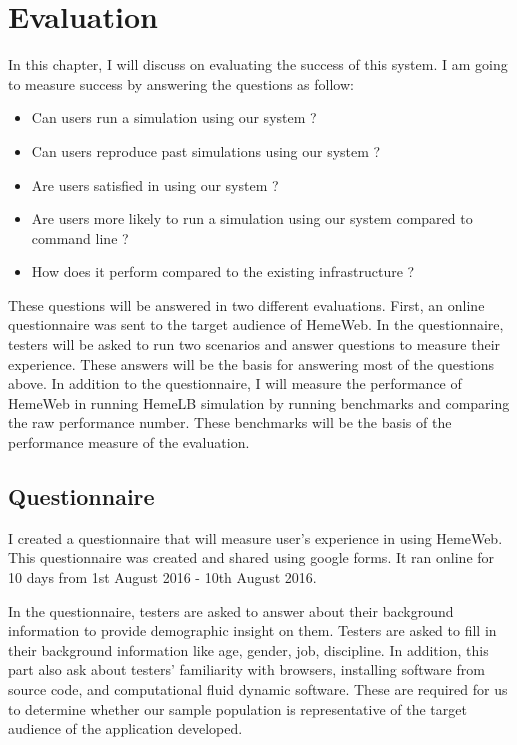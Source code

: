  

\chapter[Evaluation]{Evaluation}
In this chapter, I will discuss on evaluating the success of this system. I am going to measure success by answering the questions as follow:

\begin{itemize}
    \item Can users run a simulation using our system ?
    \item Can users reproduce past simulations using our system ?
    \item Are users satisfied in using our system ?
    \item Are users more likely to run a simulation using our system compared to command line ?
    \item How does it perform compared to the existing infrastructure ?
\end{itemize}


These questions will be answered in two different evaluations. First, an online questionnaire was sent to the target audience of HemeWeb. In the questionnaire, testers will be asked to run two scenarios and answer questions to measure their experience. These answers will be the basis for answering most of the questions above. In addition to the questionnaire, I will measure the performance of HemeWeb in running HemeLB simulation by running benchmarks and comparing the raw performance number. These benchmarks will be the basis of the performance measure of the evaluation.

\section{Questionnaire}

I created a questionnaire that will measure user's experience in using HemeWeb. This questionnaire was created and shared using google forms. It ran online for 10 days from 1st August 2016 - 10th August 2016.


In the questionnaire, testers are asked to answer about their background information to provide demographic insight on them. Testers are asked to fill in their background information like age, gender, job, discipline. In addition, this part also ask about testers' familiarity with browsers, installing software from source code, and computational fluid dynamic software. These are required for us to determine whether our sample population is representative of the target audience of the application developed.


